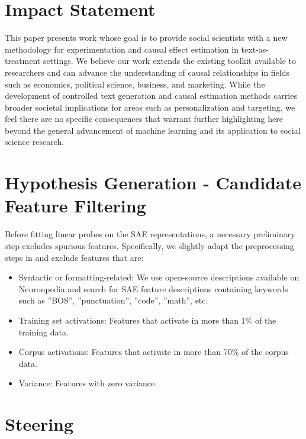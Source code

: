 \documentclass{article}
\theoremstyle{plain}
\theoremstyle{definition}
\theoremstyle{remark}
\begin{document}
\newpage
\section*{Impact Statement}
This paper presents work whose goal is to provide social scientists with a new methodology for experimentation and causal effect estimation in text-as-treatment settings. We believe our work extends the existing toolkit available to researchers and can advance the understanding of causal relationships in fields such as economics, political science, business, and marketing. While the development of controlled text generation and causal estimation methods carries broader societal implications for areas such as personalization and targeting, we feel there are no specific consequences that warrant further highlighting here beyond the general advancement of machine learning and its application to social science research.




\newpage
\appendix
\onecolumn

\section{Hypothesis Generation - Candidate Feature Filtering}
\label{sec:candidatefiltering}

Before fitting linear probes on the SAE representations, a necessary preliminary step excludes spurious features. Specifically, we slightly adapt the preprocessing steps in \citet{zheng2025model} and exclude features that are:
\begin{itemize}
    \item Syntactic or formatting-related: We use open-source descriptions available on Neuronpedia \cite{neuronpedia} and search for SAE feature descriptions containing keywords such as ”BOS”, ”punctuation”, ”code”, ”math”, etc.
    \item Training set activations: Features that activate in more than 1\% of the training data.
    \item Corpus activations: Features that activate in more than 70\% of the corpus data.
    \item Variance: Features with zero variance.
\end{itemize}

\section{Steering}
\label{sec:appendixsteering}
\end{document}
